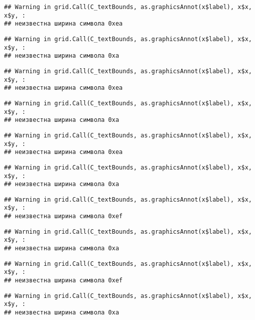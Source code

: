 \documentclass[
]{article}
\begin{document}
\begin{verbatim}
## Warning in grid.Call(C_textBounds, as.graphicsAnnot(x$label), x$x, x$y, :
## неизвестна ширина символа 0xea
\end{verbatim}

\begin{verbatim}
## Warning in grid.Call(C_textBounds, as.graphicsAnnot(x$label), x$x, x$y, :
## неизвестна ширина символа 0xa
\end{verbatim}

\begin{verbatim}
## Warning in grid.Call(C_textBounds, as.graphicsAnnot(x$label), x$x, x$y, :
## неизвестна ширина символа 0xea
\end{verbatim}

\begin{verbatim}
## Warning in grid.Call(C_textBounds, as.graphicsAnnot(x$label), x$x, x$y, :
## неизвестна ширина символа 0xa
\end{verbatim}

\begin{verbatim}
## Warning in grid.Call(C_textBounds, as.graphicsAnnot(x$label), x$x, x$y, :
## неизвестна ширина символа 0xea
\end{verbatim}

\begin{verbatim}
## Warning in grid.Call(C_textBounds, as.graphicsAnnot(x$label), x$x, x$y, :
## неизвестна ширина символа 0xa
\end{verbatim}

\begin{verbatim}
## Warning in grid.Call(C_textBounds, as.graphicsAnnot(x$label), x$x, x$y, :
## неизвестна ширина символа 0xef
\end{verbatim}

\begin{verbatim}
## Warning in grid.Call(C_textBounds, as.graphicsAnnot(x$label), x$x, x$y, :
## неизвестна ширина символа 0xa
\end{verbatim}

\begin{verbatim}
## Warning in grid.Call(C_textBounds, as.graphicsAnnot(x$label), x$x, x$y, :
## неизвестна ширина символа 0xef
\end{verbatim}

\begin{verbatim}
## Warning in grid.Call(C_textBounds, as.graphicsAnnot(x$label), x$x, x$y, :
## неизвестна ширина символа 0xa
\end{verbatim}
\end{document}
